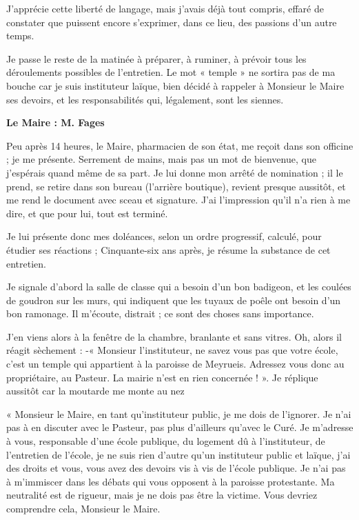 J’apprécie cette liberté de langage, mais j’avais déjà tout compris, effaré de constater
que puissent encore s’exprimer, dans ce lieu, des passions d’un autre temps.

Je passe le reste de la matinée à préparer, à ruminer, à prévoir tous les déroulements
possibles de l’entretien. Le mot « temple » ne sortira pas de ma bouche car je suis
instituteur laïque, bien décidé à rappeler à Monsieur le Maire ses devoirs, et les
responsabilités qui, légalement, sont les siennes.


\textbf{Le Maire : M. Fages}

Peu après 14 heures, le Maire, pharmacien de son état, me reçoit dans son officine ; je
me présente. Serrement de mains, mais pas un mot de bienvenue, que j’espérais
quand même de sa part. Je lui donne mon arrêté de nomination ; il le prend, se retire
dans son bureau (l’arrière boutique), revient presque aussitôt, et me rend le document
avec sceau et signature. J’ai l’impression qu’il n’a rien à me dire, et que pour lui, tout
est terminé.

Je lui présente donc mes doléances, selon un ordre progressif, calculé, pour étudier
ses réactions ; Cinquante-six ans après, je résume la substance de cet entretien.

Je signale d’abord la salle de classe qui a besoin d’un bon badigeon, et les coulées de
goudron sur les murs, qui indiquent que les tuyaux de poêle ont besoin d’un bon
ramonage. Il m’écoute, distrait ; ce sont des choses sans importance.

J’en viens alors à la fenêtre de la chambre, branlante et sans vitres. Oh, alors il réagit
sèchement :
-« Monsieur l’instituteur, ne savez vous pas que votre école, c’est un temple qui
appartient à la paroisse de Meyrueis. Adressez vous donc au propriétaire, au Pasteur.
La mairie n’est en rien concernée ! ».
Je réplique aussitôt car la moutarde me monte au nez

« Monsieur le Maire, en tant qu’instituteur public, je me dois de l’ignorer. Je n’ai pas
à en discuter avec le Pasteur, pas plus d’ailleurs qu’avec le Curé. Je m’adresse à
vous, responsable d’une école publique, du logement dû à l’instituteur, de l’entretien
de l’école, je ne suis rien d’autre qu’un instituteur public et laïque, j’ai des droits et
vous, vous avez des devoirs vis à vis de l’école publique. Je n’ai pas à m’immiscer
dans les débats qui vous opposent à la paroisse protestante. Ma neutralité est de
rigueur, mais je ne dois pas être la victime. Vous devriez comprendre cela, Monsieur
le Maire.

